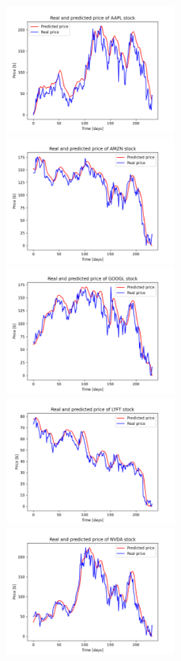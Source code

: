 \begin{figure}
\includegraphics[width=0.5\textwidth]{./graf/model1/AAPL.png}
\includegraphics[width=0.5\textwidth]{./graf/model1/AMZN.png}
\includegraphics[width=0.5\textwidth]{./graf/model1/GOOGL.png}
\includegraphics[width=0.5\textwidth]{./graf/model1/LYFT.png}
\includegraphics[width=0.5\textwidth]{./graf/model1/NVDA.png}

\end{figure}
